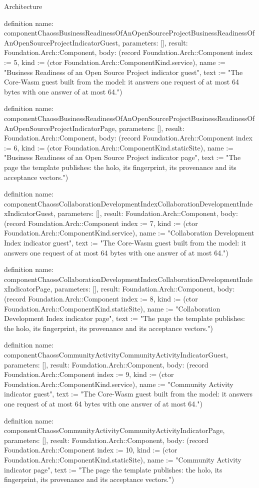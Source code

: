 \begin{lexlean}{Architecture}
\begin{semanticmodule}
definition{
  name: componentChaossBusinessReadinessOfAnOpenSourceProjectBusinessReadinessOfAnOpenSourceProjectIndicatorGuest,
  parameters: [],
  result: Foundation.Arch::Component,
  body: (record Foundation.Arch::Component {index := 5, kind := (ctor Foundation.Arch::ComponentKind.service), name := "Business Readiness of an Open Source Project indicator guest", text := "The Core-Wasm guest built from the model: it answers one request of at most 64 bytes with one answer of at most 64."})
}

definition{
  name: componentChaossBusinessReadinessOfAnOpenSourceProjectBusinessReadinessOfAnOpenSourceProjectIndicatorPage,
  parameters: [],
  result: Foundation.Arch::Component,
  body: (record Foundation.Arch::Component {index := 6, kind := (ctor Foundation.Arch::ComponentKind.staticSite), name := "Business Readiness of an Open Source Project indicator page", text := "The page the template publishes: the holo, its fingerprint, its provenance and its acceptance vectors."})
}

definition{
  name: componentChaossCollaborationDevelopmentIndexCollaborationDevelopmentIndexIndicatorGuest,
  parameters: [],
  result: Foundation.Arch::Component,
  body: (record Foundation.Arch::Component {index := 7, kind := (ctor Foundation.Arch::ComponentKind.service), name := "Collaboration Development Index indicator guest", text := "The Core-Wasm guest built from the model: it answers one request of at most 64 bytes with one answer of at most 64."})
}

definition{
  name: componentChaossCollaborationDevelopmentIndexCollaborationDevelopmentIndexIndicatorPage,
  parameters: [],
  result: Foundation.Arch::Component,
  body: (record Foundation.Arch::Component {index := 8, kind := (ctor Foundation.Arch::ComponentKind.staticSite), name := "Collaboration Development Index indicator page", text := "The page the template publishes: the holo, its fingerprint, its provenance and its acceptance vectors."})
}

definition{
  name: componentChaossCommunityActivityCommunityActivityIndicatorGuest,
  parameters: [],
  result: Foundation.Arch::Component,
  body: (record Foundation.Arch::Component {index := 9, kind := (ctor Foundation.Arch::ComponentKind.service), name := "Community Activity indicator guest", text := "The Core-Wasm guest built from the model: it answers one request of at most 64 bytes with one answer of at most 64."})
}

definition{
  name: componentChaossCommunityActivityCommunityActivityIndicatorPage,
  parameters: [],
  result: Foundation.Arch::Component,
  body: (record Foundation.Arch::Component {index := 10, kind := (ctor Foundation.Arch::ComponentKind.staticSite), name := "Community Activity indicator page", text := "The page the template publishes: the holo, its fingerprint, its provenance and its acceptance vectors."})
}


\end{semanticmodule}
\end{lexlean}
